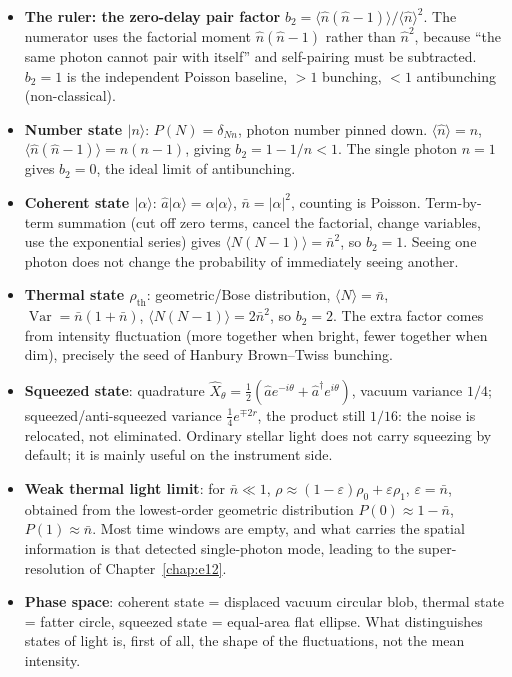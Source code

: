 \begin{itemize}
  \item \textbf{The ruler: the zero-delay pair factor} \(b_2=\langle\hat n(\hat n-1)\rangle/\langle\hat n\rangle^2\). The numerator uses the factorial moment \(\hat n(\hat n-1)\) rather than \(\hat n^2\), because ``the same photon cannot pair with itself'' and self-pairing must be subtracted. \(b_2=1\) is the independent Poisson baseline, \(>1\) bunching, \(<1\) antibunching (non-classical).
  \item \textbf{Number state \(|n\rangle\)}: \(P(N)=\delta_{Nn}\), photon number pinned down. \(\langle\hat n\rangle=n\), \(\langle\hat n(\hat n-1)\rangle=n(n-1)\), giving \(b_2=1-1/n<1\). The single photon \(n=1\) gives \(b_2=0\), the ideal limit of antibunching.
  \item \textbf{Coherent state \(|\alpha\rangle\)}: \(\hat a|\alpha\rangle=\alpha|\alpha\rangle\), \(\bar n=|\alpha|^2\), counting is Poisson. Term-by-term summation (cut off zero terms, cancel the factorial, change variables, use the exponential series) gives \(\langle N(N-1)\rangle=\bar n^2\), so \(b_2=1\). Seeing one photon does not change the probability of immediately seeing another.
  \item \textbf{Thermal state \(\rho_{\text{th}}\)}: geometric/Bose distribution, \(\langle N\rangle=\bar n\), \(\operatorname{Var}=\bar n(1+\bar n)\), \(\langle N(N-1)\rangle=2\bar n^2\), so \(b_2=2\). The extra factor comes from intensity fluctuation (more together when bright, fewer together when dim), precisely the seed of Hanbury Brown--Twiss bunching.
  \item \textbf{Squeezed state}: quadrature \(\hat X_\theta=\tfrac12(\hat a e^{-i\theta}+\hat a^\dagger e^{i\theta})\), vacuum variance \(1/4\); squeezed/anti-squeezed variance \(\tfrac14 e^{\mp 2r}\), the product still \(1/16\): the noise is relocated, not eliminated. Ordinary stellar light does not carry squeezing by default; it is mainly useful on the instrument side.
  \item \textbf{Weak thermal light limit}: for \(\bar n\ll1\), \(\rho\approx(1-\varepsilon)\rho_0+\varepsilon\rho_1\), \(\varepsilon=\bar n\), obtained from the lowest-order geometric distribution \(P(0)\approx1-\bar n\), \(P(1)\approx\bar n\). Most time windows are empty, and what carries the spatial information is that detected single-photon mode, leading to the super-resolution of Chapter~\ref{chap:e12}.
  \item \textbf{Phase space}: coherent state = displaced vacuum circular blob, thermal state = fatter circle, squeezed state = equal-area flat ellipse. What distinguishes states of light is, first of all, the shape of the fluctuations, not the mean intensity.
\end{itemize}

